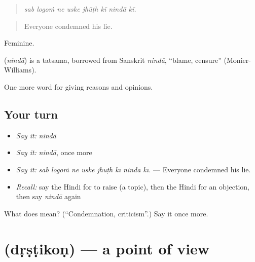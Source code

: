 \begin{quote}
       
\end{quote}

\begin{quote}
\emph{sab logoṁ ne uske jhūṭh kī nindā kī.}
\end{quote}

\begin{quote}
Everyone condemned his lie.
\end{quote}

Feminine.

\begin{cousinweb}
\textbf{} (\emph{nindā}) is a tatsama, borrowed from Sanskrit \emph{nindā}, \textquotedblleft{}blame, censure\textquotedblright{} (Monier-Williams).
\end{cousinweb}

\begin{grammarlens}[title={What you've built}]
One more word for giving reasons and opinions.
\end{grammarlens}

\subsection*{Your turn}
\begin{itemize}
\raggedright
  \item \emph{Say it:} \emph{nindā}
  \item \emph{Say it:} \emph{nindā}, once more
  \item \emph{Say it:} \emph{sab logoṁ ne uske jhūṭh kī nindā kī.} — Everyone condemned his lie.
  \item \emph{Recall:} say the Hindi for to raise (a topic), then the Hindi for an objection, then say \emph{nindā} again
\end{itemize}

\begin{tcolorbox}[breakable,colback=teal!4,colframe=teal!35!black,title={Before you move on}]
What does  mean? (\textquotedblleft{}Condemnation, criticism\textquotedblright{}.) Say it once more.
\end{tcolorbox}
\section[\texorpdfstring{\hi{दृष्टिकोण} (dṛṣṭikoṇ)}{दृष्टिकोण (dṛṣṭikoṇ)}]{ (dṛṣṭikoṇ) — a point of view}

